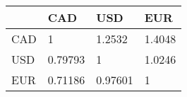 \begin{tabular}{llll}
& CAD & USD & EUR \\ 
\hline 
CAD & 1 & 1.2532 & 1.4048 \\ 
USD & 0.79793 & 1 & 1.0246 \\ 
EUR & 0.71186 & 0.97601 & 1 \\ 
\hline 
\end{tabular}